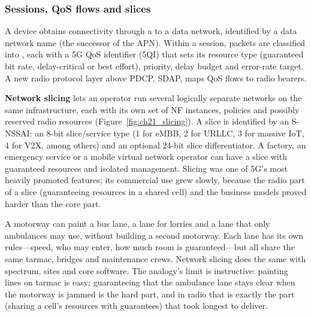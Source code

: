 \subsubsection{Sessions, QoS flows and slices}

A device obtains connectivity through a  to a data network, identified by a data
network name (the successor of the APN). Within a session, packets are classified into
, each with a 5G QoS identifier (5QI) that sets its resource type (guaranteed bit
rate, delay-critical or best effort), priority, delay budget and error-rate target. A new radio
protocol layer above PDCP, SDAP, maps QoS flows to radio bearers.

\textbf{Network slicing} lets an operator run several logically separate
networks on the same infrastructure, each with its own set of NF instances, policies and possibly
reserved radio resources (Figure~\ref{fig:ch21_slicing}). A slice is identified by an S-NSSAI: an
8-bit slice/service type (1 for eMBB, 2 for URLLC, 3 for massive IoT, 4 for V2X, among others) and an
optional 24-bit slice differentiator. A factory, an emergency service or a mobile virtual network
operator can have a slice with guaranteed resources and isolated management. Slicing was one of 5G's
most heavily promoted features; its commercial use grew slowly, because the radio part of a slice
(guaranteeing resources in a shared cell) and the business models proved harder than the core part.

\begin{analogy}
A motorway can paint a bus lane, a lane for lorries and a lane that only ambulances may use, without
building a second motorway. Each lane has its own rules---speed, who may enter, how much room is
guaranteed---but all share the same tarmac, bridges and maintenance crews. Network slicing does the
same with spectrum, sites and core software. The analogy's limit is instructive: painting lines on
tarmac is easy; guaranteeing that the ambulance lane stays clear when the motorway is jammed is the
hard part, and in radio that is exactly the part (sharing a cell's resources with guarantees) that
took longest to deliver.
\end{analogy}


